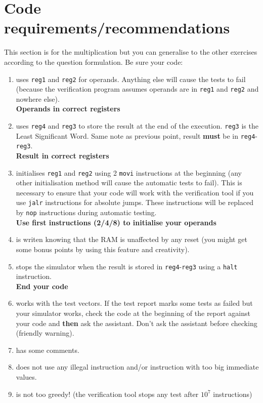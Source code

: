 \documentclass[10pt,a4paper]{article}
\theoremstyle{definition}%
\newcommand{\reg}[1]{\texttt{reg#1}}
\begin{document}
\section{Code requirements/recommendations}
This section is for the multiplication but you can generalise to the other exercises according to the question formulation.
\label{ref:guidelines}
Be sure your code:
\begin{enumerate}
\item uses \reg{1} and \reg{2} for operands. Anything else will cause the tests to fail (because the verification program assumes operands are in \reg{1} and \reg{2} and nowhere else). \\ \textbf{Operands in correct registers}
\item uses \reg{4} and \reg{3} to store the result at the end of the execution. \reg{3} is the Least Significant Word. Same note as previous point, result \textbf{must} be in \reg{4}-\reg{3}. \\ \textbf{Result in correct registers}
\item initialises \reg{1} and \reg{2} using 2 \verb!movi! instructions at the beginning (any other initialisation method will cause the automatic tests to fail). This is necessary to ensure that your code will work with the verification tool if you use \verb!jalr! instructions for absolute jumps. These instructions will be replaced by \verb!nop! instructions during automatic testing. \\ \textbf{Use first instructions (2/4/8) to initialise your operands}
\item is writen knowing that the RAM is unaffected by any reset (you might get some bonus points by using this {feature} and creativity).
\item stops the simulator when the result is stored in \reg{4}-\reg{3} using a \verb!halt! instruction. \\\textbf{End your code}
\item works with the test vectors. If the test report marks some tests as failed but your simulator works, check the code at the beginning of the report against your code and \textbf{then} ask the assistant. Don't ask the assistant before checking (friendly warning).
\item has some comments.
\item does not use any illegal instruction and/or instruction with too big immediate values.
\item is not too greedy! (the verification tool stops any test after $10^7$ instructions)
\end{enumerate}
\end{document}
